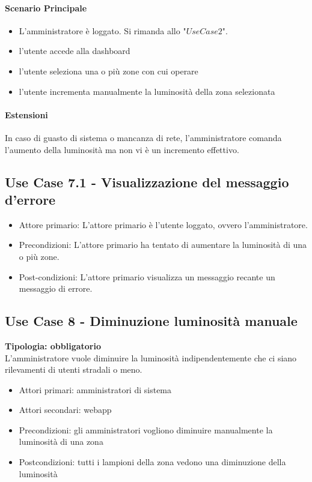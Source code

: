\documentclass[12pt]{article}
\begin{document}
\paragraph{Scenario Principale}
\begin{itemize}
	\item L'amministratore è loggato. Si rimanda allo "$Use Case 2$".
	\item l'utente accede alla dashboard
	\item l'utente seleziona una o più zone con cui operare
	\item l'utente incrementa manualmente la luminosità della zona selezionata
\end{itemize}

\paragraph{Estensioni} In caso di guasto di sistema o mancanza di rete, l'amministratore comanda l'aumento della luminosità ma non vi è un incremento effettivo.

\subsection{Use Case 7.1 - Visualizzazione del messaggio d'errore}
\begin{itemize}
	\item Attore primario: L'attore primario è l'utente loggato, ovvero l'amministratore.
	\item Precondizioni: L'attore primario ha tentato di aumentare la luminosità di una o più zone.
	\item Post-condizioni: L'attore primario visualizza un messaggio recante un messaggio di errore.
\end{itemize}

\subsection{Use Case 8 - Diminuzione luminosità manuale}
\textbf{Tipologia: obbligatorio} \\
L'amministratore vuole diminuire la luminosità indipendentemente che ci siano rilevamenti di utenti stradali o meno.
\begin{itemize}
	\item Attori primari: amministratori di sistema
	\item Attori secondari: webapp
	\item Precondizioni: gli amministratori vogliono diminuire manualmente la luminosità di una zona
	\item Postcondizioni: tutti i lampioni della zona vedono una diminuzione della luminosità
\end{itemize}
\end{document}
